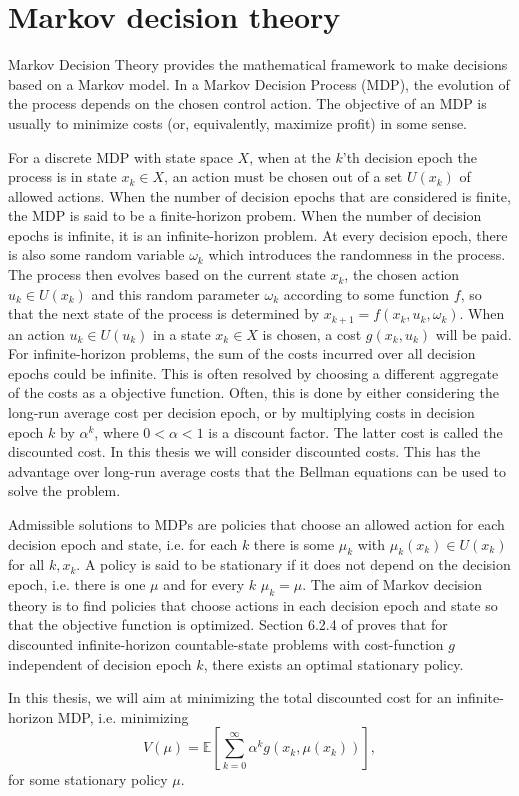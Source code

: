 \section{Markov decision theory}
Markov Decision Theory provides the mathematical framework to make decisions based on a Markov model.
In a Markov Decision Process (MDP), the evolution of the process depends on the chosen control action.
The objective of an MDP is usually to minimize costs (or, equivalently, maximize profit) in some sense.

For a discrete MDP with state space $X$, when at the $k$'th decision epoch the process is in state $x_k\in X$, an action must be chosen out of a set $U(x_k)$ of allowed actions.
When the number of decision epochs that are considered is finite, the MDP is said to be a finite-horizon probem.
When the number of decision epochs is infinite, it is an infinite-horizon problem.
At every decision epoch, there is also some random variable $\omega_k$ which introduces the randomness in the process.
The process then evolves based on the current state $x_k$, the chosen action $u_k\in U(x_k)$ and this random parameter $\omega_k$ according to some function $f$, so that the next state of the process is determined by $x_{k+1}=f(x_k,u_k,\omega_k)$.
When an action $u_k\in U(u_k)$ in a state $x_k\in X$ is chosen, a cost $g(x_k,u_k)$ will be paid.
For infinite-horizon problems, the sum of the costs incurred over all decision epochs could be infinite.
This is often resolved by choosing a different aggregate of the costs as a objective function.
Often, this is done by either considering the long-run average cost per decision epoch, or by multiplying costs in decision epoch $k$ by $\alpha^k$, where $0<\alpha<1$ is a discount factor.
The latter cost is called the discounted cost.
In this thesis we will consider discounted costs.
This has the advantage over long-run average costs that the Bellman equations can be used to solve the problem.

Admissible solutions to MDPs are policies that choose an allowed action for each decision epoch and state, i.e. for each $k$ there is some $\mu_k$ with $\mu_k(x_k)\in U(x_k)$ for all $k,x_k$.
A policy is said to be stationary if it does not depend on the decision epoch, i.e. there is one $\mu$ and for every $k$ $\mu_k=\mu$.
The aim of Markov decision theory is to find policies that choose actions in each decision epoch and state so that the objective function is optimized.
Section 6.2.4 of \cite{Puterman2008} proves that for discounted infinite-horizon countable-state problems with cost-function $g$ independent of decision epoch $k$, there exists an optimal stationary policy.

In this thesis, we will aim at minimizing the total discounted cost for an infinite-horizon MDP, i.e. minimizing
\[
V(\mu)=\mathbb{E}\left[\sum\limits_{k=0}^\infty \alpha^k g(x_k,\mu(x_k))\right],
\]
for some stationary policy $\mu$.